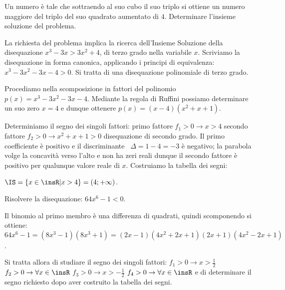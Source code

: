\begin{esempio}
Un numero è tale che sottraendo al suo cubo il suo triplo si ottiene un numero 
maggiore del triplo del suo quadrato aumentato di $ 4 $. Determinare l'insieme 
soluzione del problema.

La richiesta del problema implica la ricerca dell'Insieme Soluzione della 
disequazione $x^3-3x>3x^2+4$, di terzo grado nella variabile $x$. Scriviamo la 
disequazione in forma canonica, applicando i principi di equivalenza: 
$x^3-3x^2-3x-4>0$. Si tratta di una disequazione polinomiale di terzo grado.

Procediamo nella scomposizione in fattori del polinomio $p(x)=x^3-3x^2-3x-4$. 
Mediante la regola di Ruffini possiamo determinare un suo zero $x=4$ e dunque 
ottenere $p(x)=(x-4)(x^2+x+1)$.

Determiniamo il segno dei singoli fattori: primo fattore $f_1>0\to x>4$ secondo 
fattore $f_2>0\to x^2+x+1>0$ disequazione di secondo grado. Il primo 
coefficiente è positivo e il discriminante \ $\Delta =1-4=-3$ è negativo; la 
parabola volge la concavità verso l'alto e non ha zeri reali dunque il secondo 
fattore è positivo per qualunque valore reale di $x$. Costruiamo la tabella dei 
segni:
\begin{center}
 
\end{center}
$\IS=\{x\in \insR | x>4\}=(4;+\infty )$.
\end{esempio}

\begin{esempio}
Risolvere la disequazione: $64x^6-1<0$.

Il binomio al primo membro è una differenza di quadrati, quindi scomponendo si 
ottiene: $64x^6-1=(8x^3-1)(8x^3+1)=(2x-1)(4x^2+2x+1)(2x+1)(4x^2-2x+1)$.

Si tratta allora di studiare il segno dei singoli fattori: $f_1>0\to x>\frac 1 
2$ $f_2>0\to \forall x\in \insR$ $f_3>0\to x>-\frac 1 2$ $f_4>0\to \forall x\in 
\insR$ e di determinare il segno richiesto dopo aver costruito la tabella dei 
segni.
\end{esempio}

